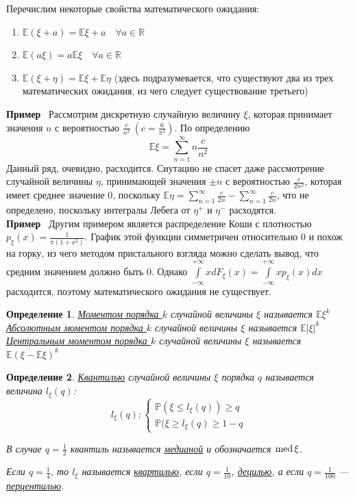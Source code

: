 \documentclass[12pt]{article}
\newtheorem{Def}{Определение}
\newenvironment{Ex}{{\bf Пример}\ }{}
\numberwithin{Th}{section}
\numberwithin{Def}{section}
\numberwithin{Lem}{section}
\numberwithin{St}{section}
\numberwithin{equation}{section}
\newcommand\Pro{\mathbb{P}} %
\newcommand\Real{\mathbb{R}} %
\newcommand\Expec{\mathbb{E}} %
\newcommand\Med{{\rm med \,}} %
\begin{document}
Перечислим некоторые свойства математического ожидания:
\begin{enumerate}
	\item $\Expec(\xi + a) = \Expec\xi + a \quad \forall a \in \Real$
	\item $\Expec(a\xi) = a\Expec\xi \quad \forall a \in \Real$
	\item $\Expec(\xi + \eta) = \Expec\xi + \Expec\eta$ (здесь подразумевается, что существуют два из трех математических ожидания, из чего следует существование третьего)
\end{enumerate}
\begin{Ex}
Рассмотрим дискретную случайную величину $\xi$, которая принимает значения $n$ с вероятностью $\frac{c}{n^2} \ (c = \frac{6}{\pi^2})$. По определению
$$ \Expec\xi = \sum\limits_{n=1}^{\infty} n \frac{c}{n^2} $$
Данный ряд, очевидно, расходится. Сиутацию не спасет даже рассмотрение случайной величины $\eta$, принимающей значения $\pm n$ с вероятностью $\frac{c}{2n^2}$, 
которая имеет среднее значение 0, 
поскольку $\Expec\eta = \sum\limits_{n=1}^{\infty} \frac{c}{2n} - \sum\limits_{n=1}^{\infty} \frac{c}{2n}$, что не определено, поскольку интегралы Лебега от $\eta^+$ и $\eta^-$ расходятся.\\
\end{Ex}
\begin{Ex}
Другим примером является распределение Коши с плотностью $p_\xi(x) = \frac{1}{\pi(1+x^2)}$. График этой функции симметричен относительно 0 и похож на горку, из чего
методом пристального взгляда можно сделать вывод, что средним значением должно быть 0. Однако  $
\int\limits_{-\infty}^{+\infty} x dF_\xi(x) =  \int\limits_{-\infty}^{+\infty} x p_\xi(x)dx$ расходится, поэтому математического ожидания не существует.
\end{Ex}

\begin{Def}
\underline{Моментом порядка $k$} случайной величины $\xi$ называется $\Expec\xi^k$ \\
\underline{Абсолютным моментом порядка $k$} случайной величины $\xi$ называется $\Expec|\xi|^k$ \\
\underline{Центральным моментом порядка $k$} случайной величины $\xi$ называется $\Expec(\xi - \Expec\xi)^k$ \\
\end{Def}

\begin{Def}
\underline{Квантилью} случайной величины $\xi$ порядка $q$ называется величина $l_\xi(q)$:
\[
   	l_\xi(q) \colon 
  	\begin{cases}
  		\Pro(\xi \le l_\xi(q)) \ge q \\
  		\Pro(\xi \ge l_\xi(q) \ge 1-q
  	\end{cases}
  \]
  
  В случае $q=\frac12$ квантиль называется \underline{медианой} и обозначается $\Med\xi$.
  
  Если $q=\frac14$, то $l_\xi$ называется \underline{квартилью}, если $q=\frac1{10}$, \underline{децилью}, а если $q=\frac{1}{100}$ --- \underline{перцентилью}.
\end{Def}
\end{document}
